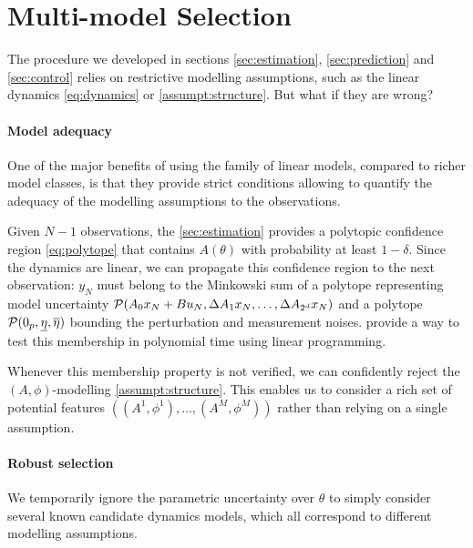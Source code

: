 \documentclass{article}
\begin{document}
\section{Multi-model Selection}
\label{sec:multi-model}

The procedure we developed in sections \ref{sec:estimation}, \ref{sec:prediction} and \ref{sec:control} relies on restrictive modelling assumptions, such as the linear dynamics \eqref{eq:dynamics} or \autoref{assumpt:structure}. But what if they are wrong?

\paragraph{Model adequacy}

One of the major benefits of using the family of linear models, compared to richer model classes, is that they provide strict conditions allowing to quantify the adequacy of the modelling assumptions to the observations.

Given $N-1$ observations, the \autoref{sec:estimation} provides a polytopic confidence region \eqref{eq:polytope} that contains $A(\theta)$ with probability at least $1-\delta$. Since the dynamics are linear, we can propagate this confidence region to the next observation: $y_{N}$ must belong to the Minkowski sum of a polytope representing model uncertainty $\mathcal{P}(A_{0} x_N + Bu_N, \Delta A_{1}x_N,\dots, \Delta A_{2^d}x_N)$ and a polytope $\mathcal{P}(0_p, \underline{\eta}, \overline{\eta})$ bounding the perturbation and measurement noises. \citet{delos2015} provide a way to test this membership in polynomial time using linear programming.

Whenever this membership property is not verified, we can confidently reject the $(A,\phi)$-modelling \autoref{assumpt:structure}. This enables us to consider a rich set of potential features $\left((A^1, \phi^1), \dots, (A^M, \phi^M)\right)$ rather than relying on a single assumption.

\paragraph{Robust selection}

We temporarily ignore the parametric uncertainty over $\theta$ to simply consider several known candidate dynamics models, which all correspond to different modelling assumptions.
\end{document}
